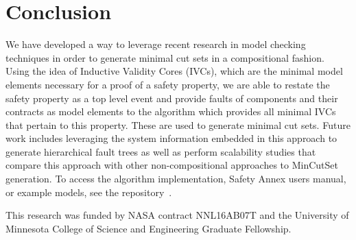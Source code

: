 \section{Conclusion}

We have developed a way to leverage recent research in model checking techniques in order to generate minimal cut sets in a compositional fashion. Using the idea of Inductive Validity Cores (IVCs), which are the minimal model elements necessary for a proof of a safety property, we are able to restate the safety property as a top level event and provide faults of components and their contracts as model elements to the \aivcalg algorithm which provides all minimal IVCs that pertain to this property. These are used to generate minimal cut sets. Future work includes leveraging the system information embedded in this approach to generate hierarchical fault trees as well as perform scalability studies that compare this approach with other non-compositional approaches to MinCutSet generation.  %
To access the algorithm implementation, Safety Annex users manual, or example models, see the repository~\cite{SAGithub}. 

\vspace{2 mm}
 This research was funded by NASA contract NNL16AB07T and the University of Minnesota College of Science and Engineering Graduate Fellowship.


